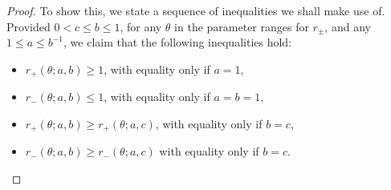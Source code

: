 \documentclass[pdftex]{sigma}
\numberwithin{equation}{section}
\begin{document}
\begin{proof}
To show this, we state a sequence of inequalities we shall make use of. Provided $0 < c \leq b \leq 1$, for any $\theta$ in the parameter ranges for $r_{\pm}$, and any $1 \leq a \leq b^{-1}$, we claim that the following inequalities hold:
 \begin{itemize}\itemsep=0pt\samepage
 \item[$(i)$] $r_+(\theta;a,b) \geq 1$, with equality only if $a=1$,
 \item[$(ii)$] $r_-(\theta;a,b) \leq 1$, with equality only if $a=b=1$,
 \item[$(iii)$] $r_{+}(\theta;a,b) \geq r_{+}(\theta;a,c)$, with equality only if $b=c$,
 \item[$(iv)$] $r_{-}(\theta;a,b) \geq r_{-}(\theta;a,c)$ with equality only if $b=c$.
 \end{itemize}


\end{proof}
\end{document}
